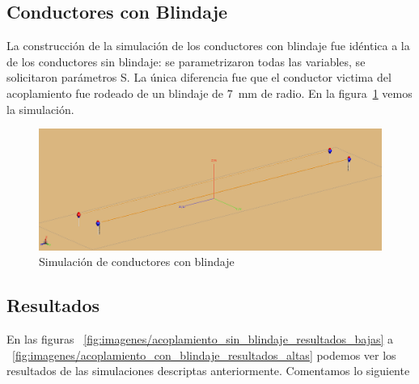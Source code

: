 \subsection{Conductores con Blindaje}%
\label{sub:conductores_con_blindaje}

La construcción de la simulación de los conductores con blindaje fue idéntica a la de los conductores sin blindaje: se parametrizaron todas las variables, se solicitaron parámetros S. La única diferencia fue que el conductor victima del acoplamiento fue rodeado de un blindaje de \SI{7}{\mm} de radio. En la figura~\ref{fig:imagenes/conductores_con_blindaje_simulacion} vemos la simulación.

\begin{figure}[ht]
  \centering
  \includegraphics[width=0.8\linewidth]{imagenes/conductores_con_blindaje_simulacion.png}
  \caption{Simulación de conductores con blindaje}%
  \label{fig:imagenes/conductores_con_blindaje_simulacion}
\end{figure}

\subsection{Resultados}%
\label{sub:resultados_conductores}

En las figuras ~\ref{fig:imagenes/acoplamiento_sin_blindaje_resultados_bajas} a ~\ref{fig:imagenes/acoplamiento_con_blindaje_resultados_altas} podemos ver los resultados de las simulaciones descriptas anteriormente. Comentamos lo siguiente

